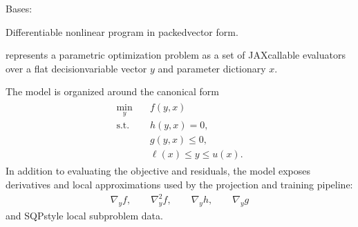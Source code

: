 \documentclass[letterpaper,10pt,english,openany,oneside]{sphinxmanual}
\begin{document}
\begin{fulllineitems}

\pysigstartsignatures
{}
\pysigstopsignatures
\sphinxAtStartPar
Bases: 

\sphinxAtStartPar
Differentiable nonlinear program in packed\sphinxhyphen{}vector form.

\sphinxAtStartPar
{} represents a parametric optimization problem as a set of
JAX\sphinxhyphen{}callable evaluators over a flat decision\sphinxhyphen{}variable vector \(y\) and
parameter dictionary \(x\).

\sphinxAtStartPar
The model is organized around the canonical form
\begin{equation*}
\begin{split}\begin{aligned}
    \min_y \quad & f(y, x) \\
    \text{s.t.}\quad & h(y, x) = 0, \\
    & g(y, x) \le 0, \\
    & \ell(x) \le y \le u(x).
\end{aligned}\end{split}
\end{equation*}
\sphinxAtStartPar
In addition to evaluating the objective and residuals, the model exposes
derivatives and local approximations used by the projection and training
pipeline:
\begin{equation*}
\begin{split}\nabla_y f,\qquad \nabla_y^2 f,\qquad
\nabla_y h,\qquad \nabla_y g\end{split}
\end{equation*}
\sphinxAtStartPar
and SQP\sphinxhyphen{}style local subproblem data.


\end{fulllineitems}
\end{document}
